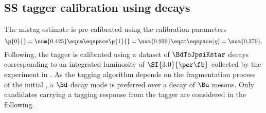 %

\subsection[
  head={\ac{SS} tagger calibration using \BdToJpsiKstar decays},
  tocentry={\ac{SS} tagger calibration using \BdToJpsiKstarHyperref decays}
]{\ac{SS} tagger calibration using \BdToJpsiKstarbfsf decays}
\label{sec:flavour_tagging:calibration:ss}

The \SSpi mistag estimate is pre-calibrated using the calibration parameters
%
\begin{equation}
\label{eq:tagging:sspion_precalibration}
    \p{0}{} = \num{0.425}\eqcm\eqspace
    \p{1}{} = \num{0.939}\eqcm\eqspace
    \langle\eta\rangle = \num{0.379}.
\end{equation}
%
Following, the \SSpi tagger is calibrated using a dataset of $\BdToJpsiKstar$
decays corresponding to an integrated luminosity of $\SI{3.0}{\per\fb}$
collected by the \LHCb experiment in \RunOne. As the \SSpi tagging algorithm
depends on the fragmentation process of the initial \Bmeson, a $\Bd$ decay mode
is preferred over a decay of $\Bu$ mesons. Only candidates carrying a tagging
response from the \SSpi tagger are considered in the following.

